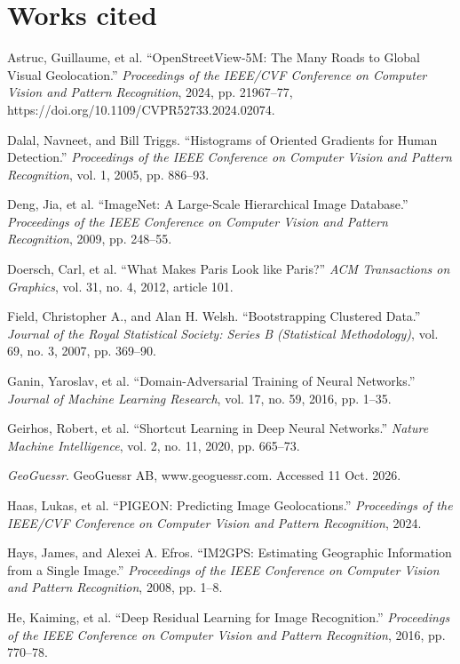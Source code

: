 \documentclass[11pt]{article}
\begin{document}
\section*{Works cited}
\begin{description}[leftmargin=2em,labelindent=0pt,font=\normalfont,itemsep=2pt]\small
\item Astruc, Guillaume, et al. ``OpenStreetView-5M: The Many Roads to Global Visual Geolocation.'' \emph{Proceedings of the IEEE/CVF Conference on Computer Vision and Pattern Recognition}, 2024, pp. 21967--77, https://doi.org/10.1109/CVPR52733.2024.02074.
\item Dalal, Navneet, and Bill Triggs. ``Histograms of Oriented Gradients for Human Detection.'' \emph{Proceedings of the IEEE Conference on Computer Vision and Pattern Recognition}, vol. 1, 2005, pp. 886--93.
\item Deng, Jia, et al. ``ImageNet: A Large-Scale Hierarchical Image Database.'' \emph{Proceedings of the IEEE Conference on Computer Vision and Pattern Recognition}, 2009, pp. 248--55.
\item Doersch, Carl, et al. ``What Makes Paris Look like Paris?'' \emph{ACM Transactions on Graphics}, vol. 31, no. 4, 2012, article 101.
\item Field, Christopher A., and Alan H. Welsh. ``Bootstrapping Clustered Data.'' \emph{Journal of the Royal Statistical Society: Series B (Statistical Methodology)}, vol. 69, no. 3, 2007, pp. 369--90.
\item Ganin, Yaroslav, et al. ``Domain-Adversarial Training of Neural Networks.'' \emph{Journal of Machine Learning Research}, vol. 17, no. 59, 2016, pp. 1--35.
\item Geirhos, Robert, et al. ``Shortcut Learning in Deep Neural Networks.'' \emph{Nature Machine Intelligence}, vol. 2, no. 11, 2020, pp. 665--73.
\item \emph{GeoGuessr}. GeoGuessr AB, www.geoguessr.com. Accessed 11 Oct. 2026.
\item Haas, Lukas, et al. ``PIGEON: Predicting Image Geolocations.'' \emph{Proceedings of the IEEE/CVF Conference on Computer Vision and Pattern Recognition}, 2024.
\item Hays, James, and Alexei A. Efros. ``IM2GPS: Estimating Geographic Information from a Single Image.'' \emph{Proceedings of the IEEE Conference on Computer Vision and Pattern Recognition}, 2008, pp. 1--8.
\item He, Kaiming, et al. ``Deep Residual Learning for Image Recognition.'' \emph{Proceedings of the IEEE Conference on Computer Vision and Pattern Recognition}, 2016, pp. 770--78.

\end{description}
\end{document}
